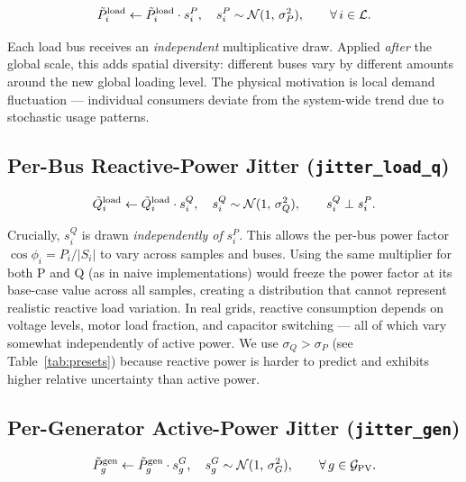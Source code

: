 \documentclass{article}
\begin{document}
\begin{equation}
  \tilde{P}^{\rm load}_{i} \leftarrow \tilde{P}^{\rm load}_{i}
    \cdot s^P_i, \quad s^P_i \sim \mathcal{N}(1,\, \sigma_P^2),
  \qquad \forall\, i \in \mathcal{L}.
  \label{eq:p_jitter}
\end{equation}

Each load bus receives an \emph{independent} multiplicative draw.
Applied \emph{after} the global scale, this adds spatial diversity:
different buses vary by different amounts around the new global loading level.
The physical motivation is local demand fluctuation --- individual consumers
deviate from the system-wide trend due to stochastic usage patterns.

\subsection{Per-Bus Reactive-Power Jitter (\texttt{jitter\_load\_q})}

\begin{equation}
  \tilde{Q}^{\rm load}_{i} \leftarrow \tilde{Q}^{\rm load}_{i}
    \cdot s^Q_i, \quad s^Q_i \sim \mathcal{N}(1,\, \sigma_Q^2),
  \qquad s^Q_i \perp s^P_i.
  \label{eq:q_jitter}
\end{equation}

Crucially, $s^Q_i$ is drawn \emph{independently of} $s^P_i$.  This allows the
per-bus power factor $\cos\phi_i = P_i / |S_i|$ to vary across samples and
buses.  Using the same multiplier for both P and Q (as in naive implementations)
would freeze the power factor at its base-case value across all samples,
creating a distribution that cannot represent realistic reactive load variation.
In real grids, reactive consumption depends on voltage levels, motor load
fraction, and capacitor switching --- all of which vary somewhat independently
of active power.  We use $\sigma_Q > \sigma_P$ (see Table~\ref{tab:presets})
because reactive power is harder to predict and exhibits higher relative
uncertainty than active power.

\subsection{Per-Generator Active-Power Jitter (\texttt{jitter\_gen})}

\begin{equation}
  \tilde{P}^{\rm gen}_{g} \leftarrow \tilde{P}^{\rm gen}_{g}
    \cdot s^G_g, \quad s^G_g \sim \mathcal{N}(1,\, \sigma_G^2),
  \qquad \forall\, g \in \mathcal{G}_{\rm PV}.
  \label{eq:gen_jitter}
\end{equation}
\end{document}
